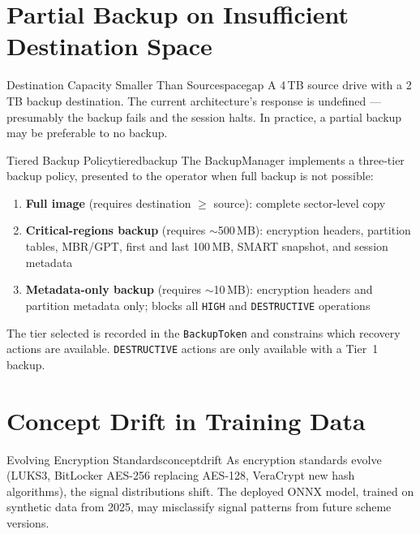 \documentclass[11pt,a4paper]{report}
\begin{document}
\section{Partial Backup on Insufficient Destination Space}

\begin{edgecase}{Destination Capacity Smaller Than Source}{spacegap}
A 4\,TB source drive with a 2\,TB backup destination. The current architecture's response is undefined --- presumably the backup fails and the session halts. In practice, a partial backup may be preferable to no backup.
\end{edgecase}

\begin{solution}{Tiered Backup Policy}{tieredbackup}
The BackupManager implements a three-tier backup policy, presented to the operator when full backup is not possible:
\begin{enumerate}[noitemsep]
  \item \textbf{Full image} (requires destination $\geq$ source): complete sector-level copy
  \item \textbf{Critical-regions backup} (requires $\sim$500\,MB): encryption headers, partition tables, MBR/GPT, first and last 100\,MB, SMART snapshot, and session metadata
  \item \textbf{Metadata-only backup} (requires $\sim$10\,MB): encryption headers and partition metadata only; blocks all \texttt{HIGH} and \texttt{DESTRUCTIVE} operations
\end{enumerate}
The tier selected is recorded in the \texttt{BackupToken} and constrains which recovery actions are available. \texttt{DESTRUCTIVE} actions are only available with a Tier~1 backup.
\end{solution}

\section{Concept Drift in Training Data}

\begin{edgecase}{Evolving Encryption Standards}{conceptdrift}
As encryption standards evolve (LUKS3, BitLocker AES-256 replacing AES-128, VeraCrypt new hash algorithms), the signal distributions shift. The deployed ONNX model, trained on synthetic data from 2025, may misclassify signal patterns from future scheme versions.
\end{edgecase}
\end{document}
